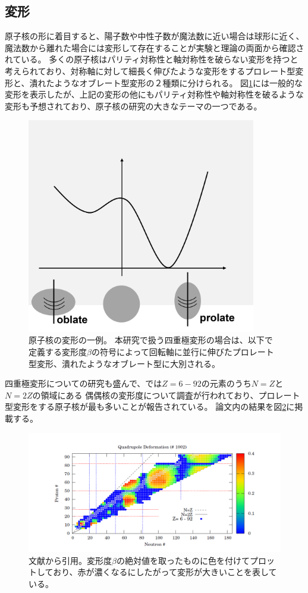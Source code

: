 \documentclass[12pt]{jarticle}
\begin{document}
\subsection{変形}
原子核の形に着目すると、陽子数や中性子数が魔法数に近い場合は球形に近く、魔法数から離れた場合には変形して存在することが実験と理論の両面から確認されている。
多くの原子核はパリティ対称性と軸対称性を破らない変形を持つと考えられており、対称軸に対して細長く伸びたような変形をするプロレート型変形と、潰れたようなオブレート型変形の２種類に分けられる。
図\ref{fig:deformation}には一般的な変形を表示したが、上記の変形の他にもパリティ対称性や軸対称性を破るような変形も予想されており、原子核の研究の大きなテーマの一つである。
\begin{figure}[H]
    \centering
    \includegraphics[width=100mm]{../変形図.png}
    \caption{
        原子核の変形の一例。
        本研究で扱う四重極変形の場合は、以下で定義する変形度$\beta$の符号によって回転軸に並行に伸びたプロレート型変形、潰れたようなオブレート型に大別される。
        }\label{fig:deformation}
\end{figure}
四重極変形についての研究も盛んで、\cite{ebata}では$Z=6-92$の元素のうち$N=Z$と$N=2Z$の領域にある
偶偶核の変形度について調査が行われており、プロレート型変形をする原子核が最も多いことが報告されている。
論文内の結果を図\ref{fig:deformation_ebata-san}に掲載する。
\begin{figure}[H]
    \centering
    \includegraphics[width=130mm]{../quadrupole_moment_nakatsukasa-san.png}
    \caption{文献\cite{ebata}から引用。変形度$\beta$の絶対値を取ったものに色を付けてプロットしており、赤が濃くなるにしたがって変形が大きいことを表している。
        }\label{fig:deformation_ebata-san}
\end{figure}
\end{document}
